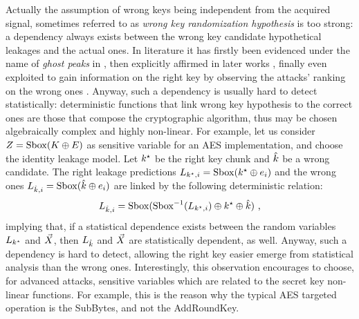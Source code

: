 \begin{remark}\label{rem:ghost}
Actually the assumption of wrong keys being independent from the acquired signal, sometimes referred to as \emph{wrong key randomization hypothesis} \cite{harpes1996cryptanalysis} is too strong: a dependency always exists between the wrong key candidate hypothetical leakages and the actual ones. In literature it has firstly been evidenced under the name of \emph{ghost peaks} in \cite{brier2004correlation}, then explicitly affirmed in later works \cite{rivain2008exact,fei2012statistical}, finally even exploited to gain information on the right key by observing the attacks' ranking on the wrong ones \cite{lomne2014estimate}. Anyway, such a dependency is usually hard to detect statistically: deterministic functions that link wrong key hypothesis to the correct ones are those that compose the cryptographic algorithm, thus may be chosen algebraically complex and highly non-linear. For example, let us consider $Z = \mathrm{Sbox}(K \oplus E)$ as sensitive variable for an AES implementation, and choose the identity leakage model. Let $k^\star$ be the right key chunk and $\hat{k}$ be a wrong candidate. The right leakage predictions $L_{k^\star, i} = \mathrm{Sbox}(k^\star \oplus e_i)$ and the wrong ones $L_{\hat{k}, i} = \mathrm{Sbox}(\hat{k} \oplus e_i)$ are linked by the following deterministic relation: 
\begin{equation*}
L_{\hat{k}, i} = \mathrm{Sbox}(\mathrm{Sbox}^{-1}(L_{k^\star, i})\oplus k^\star \oplus \hat{k}) \mbox{ ,}
\end{equation*}
implying that, if a statistical dependence exists between the random variables $L_{k^\star}$ and $\vec{X}$, then $L_{\hat{k}}$ and $\vec{X}$ are statistically dependent, as well. Anyway, such a dependency is hard to detect, allowing the right key easier emerge from statistical analysis than the wrong ones. Interestingly, this observation encourages to choose, for advanced attacks, sensitive variables which are related to the secret key \via non-linear functions. For example, this is the reason why the typical AES targeted operation is the SubBytes, and not the AddRoundKey.
\end{remark}


